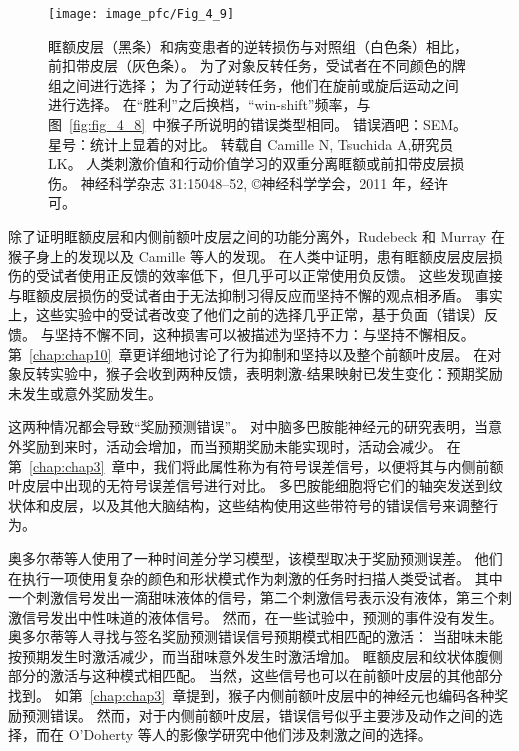 \begin{figure}[!htb]
	\centering
	\texttt{[image: image\_pfc/Fig\_4\_9]}
	\caption{眶额皮层（黑条）和病变患者的逆转损伤与对照组（白色条）相比，前扣带皮层（灰色条）。
		为了对象反转任务，受试者在不同颜色的牌组之间进行选择；
		为了行动逆转任务，他们在旋前或旋后运动之间进行选择。
		在“胜利”之后换档，“win-shift”频率，与图~\ref{fig:fig_4_8}~中猴子所说明的错误类型相同。
		错误酒吧：SEM。
		星号：统计上显着的对比。
		转载自 Camille N, Tsuchida A,研究员LK。
		人类刺激价值和行动价值学习的双重分离眶额或前扣带皮层损伤。
		神经科学杂志 31:15048–52, ©神经科学学会，2011 年，经许可。}
	\label{fig:fig_4_9}
\end{figure}


除了证明眶额皮层和内侧前额叶皮层之间的功能分离外，Rudebeck 和 Murray 在猴子身上的发现以及 Camille 等人的发现。
在人类中证明，患有眶额皮层皮层损伤的受试者使用正反馈的效率低下，但几乎可以正常使用负反馈。
这些发现直接与眶额皮层损伤的受试者由于无法抑制习得反应而坚持不懈的观点相矛盾。
事实上，这些实验中的受试者改变了他们之前的选择几乎正常，基于负面（错误）反馈。
与坚持不懈不同，这种损害可以被描述为坚持不力：与坚持不懈相反。
第~\ref{chap:chap10}~章更详细地讨论了行为抑制和坚持以及整个前额叶皮层。
在对象反转实验中，猴子会收到两种反馈，表明刺激-结果映射已发生变化：预期奖励未发生或意外奖励发生。\par
这两种情况都会导致“奖励预测错误”\cite{schultz2000neuronal}。
对中脑多巴胺能神经元的研究表明，当意外奖励到来时，活动会增加，而当预期奖励未能实现时，活动会减少\cite{schultz1998predictive}。
在第~\ref{chap:chap3}~章中，我们将此属性称为有符号误差信号，以便将其与内侧前额叶皮层中出现的无符号误差信号进行对比。
多巴胺能细胞将它们的轴突发送到纹状体和皮层，以及其他大脑结构，这些结构使用这些带符号的错误信号来调整行为。\par


奥多尔蒂等人\cite{o2003temporal}使用了一种时间差分学习模型，该模型取决于奖励预测误差。
他们在执行一项使用复杂的颜色和形状模式作为刺激的任务时扫描人类受试者。
其中一个刺激信号发出一滴甜味液体的信号，第二个刺激信号表示没有液体，第三个刺激信号发出中性味道的液体信号。
然而，在一些试验中，预测的事件没有发生。
奥多尔蒂等人寻找与签名奖励预测错误信号预期模式相匹配的激活：
当甜味未能按预期发生时激活减少，而当甜味意外发生时激活增加。
眶额皮层和纹状体腹侧部分的激活与这种模式相匹配。
当然，这些信号也可以在前额叶皮层的其他部分找到。
如第~\ref{chap:chap3}~章提到，猴子内侧前额叶皮层中的神经元也编码各种奖励预测错误\cite{matsumoto2007medial,seo2007temporal,hayden2011surprise}。
然而，对于内侧前额叶皮层，错误信号似乎主要涉及动作之间的选择，而在 O'Doherty 等人\cite{o2003temporal}的影像学研究中他们涉及刺激之间的选择。\par



